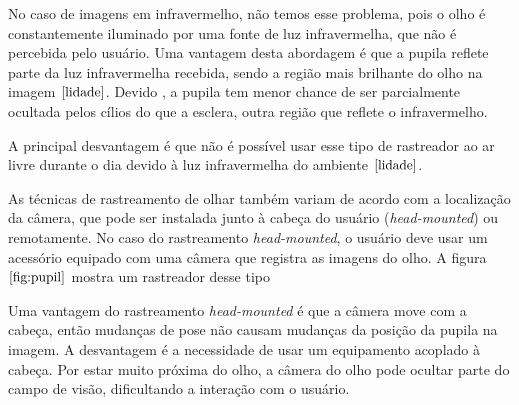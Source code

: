 No caso de imagens em infravermelho, não temos esse problema, pois o olho é constantemente iluminado por uma fonte de luz infravermelha, que não é percebida pelo usuário. Uma vantagem desta abordagem é que a pupila reflete  parte da luz infravermelha recebida, sendo a região mais brilhante do olho na imagem $\cite{lidade}$. Devido  , a pupila tem menor chance de ser parcialmente ocultada pelos  cílios do que a esclera, outra região que reflete o infravermelho. %

A principal desvantagem é que não é possível usar esse tipo de rastreador ao ar livre durante o dia devido à luz infravermelha do ambiente $\cite{lidade}$.

As técnicas de rastreamento de olhar também variam de acordo com a localização da câmera, que pode ser instalada junto à cabeça do usuário (\textit{head-mounted}) ou remotamente. No caso do rastreamento \textit{head-mounted}, o usuário deve usar um acessório equipado com uma câmera que registra as imagens do olho. A figura $\ref{fig:pupil}$ mostra um rastreador desse tipo


Uma vantagem do rastreamento \textit{head-mounted} é que a câmera  move com a cabeça, então mudanças de pose não causam mudanças da posição da pupila na imagem. A desvantagem é a necessidade de usar um equipamento acoplado à cabeça. Por estar muito próxima do olho, a câmera do olho pode ocultar parte do campo de visão, dificultando a interação com o usuário.


